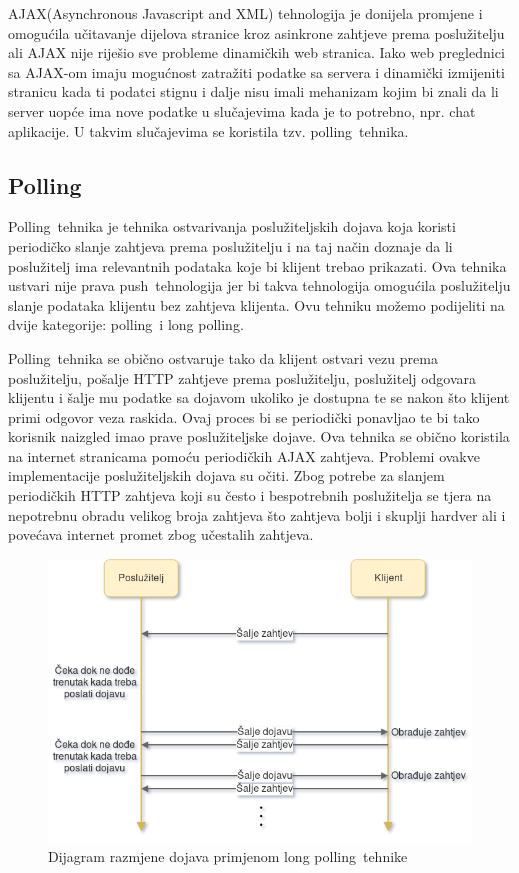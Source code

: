 \documentclass[times, utf8, zavrsni]{fer}
\begin{document}
AJAX(Asynchronous Javascript and XML) tehnologija je donijela promjene i omogućila učitavanje dijelova stranice kroz asinkrone zahtjeve prema poslužitelju ali AJAX nije riješio sve probleme dinamičkih web stranica. Iako web preglednici sa AJAX-om imaju mogućnost zatražiti podatke sa servera i dinamički izmijeniti stranicu kada ti podatci stignu i dalje nisu imali mehanizam kojim bi znali da li server uopće ima nove podatke u slučajevima kada je to potrebno, npr. chat aplikacije. U takvim slučajevima se koristila tzv. \glqq polling\grqq\  tehnika.

\subsection{Polling}
\glqq Polling\grqq\  tehnika je tehnika ostvarivanja poslužiteljskih dojava koja koristi periodičko slanje zahtjeva prema poslužitelju i na taj način doznaje da li poslužitelj ima relevantnih podataka koje bi klijent trebao prikazati. Ova tehnika ustvari nije prava \glqq push\grqq\  tehnologija jer bi takva tehnologija omogućila poslužitelju slanje podataka klijentu bez zahtjeva klijenta. Ovu tehniku možemo podijeliti na dvije kategorije: \glqq polling\grqq\  i \glqq long polling\grqq .

\glqq Polling\grqq\  tehnika se obično ostvaruje tako da klijent ostvari vezu prema poslužitelju, pošalje HTTP zahtjeve prema poslužitelju, poslužitelj odgovara klijentu i šalje mu podatke sa dojavom ukoliko je dostupna te se nakon što klijent primi odgovor veza raskida. Ovaj proces bi se periodički ponavljao te bi tako korisnik naizgled imao prave poslužiteljske dojave. Ova tehnika se obično koristila na internet stranicama pomoću periodičkih AJAX zahtjeva. Problemi ovakve implementacije poslužiteljskih dojava su očiti. Zbog potrebe za slanjem periodičkih HTTP zahtjeva koji su često i bespotrebnih poslužitelja se tjera na nepotrebnu obradu velikog broja zahtjeva što zahtjeva bolji i skuplji hardver ali i povećava internet promet zbog učestalih zahtjeva.

\begin{figure}[htb]
\centering
\includegraphics[width=14cm]{img/long-polling.png}
\caption{Dijagram razmjene dojava primjenom \glqq long polling\grqq\  tehnike}
\label{fig:long-polling-image}
\end{figure}
\end{document}
